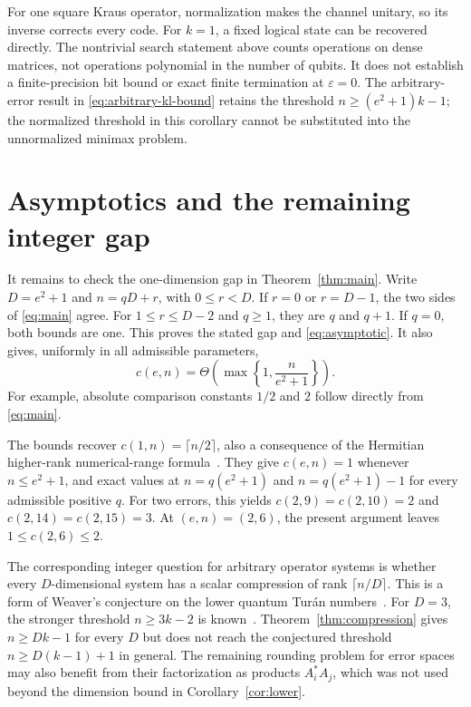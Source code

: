 \documentclass[11pt]{article}
\theoremstyle{remark}
\numberwithin{equation}{section}
\begin{document}
For one square Kraus operator, normalization makes the channel unitary,
so its inverse corrects every code. For $k=1$, a fixed logical state
can be recovered directly. The nontrivial search statement above counts
operations on dense matrices, not operations polynomial in the number
of qubits. It does not establish a finite-precision bit bound or exact
finite termination at $\varepsilon=0$. The arbitrary-error result in
\eqref{eq:arbitrary-kl-bound} retains the threshold
$n\ge(e^2+1)k-1$; the normalized threshold in this corollary cannot be
substituted into the unnormalized minimax problem.

\section{Asymptotics and the remaining integer gap}\label{sec:integer-gap}

It remains to check the one-dimension gap in Theorem~\ref{thm:main}.
Write $D=e^2+1$ and $n=qD+r$, with $0\le r<D$.
If $r=0$ or $r=D-1$, the two sides of \eqref{eq:main} agree.
For $1\le r\le D-2$ and $q\ge1$, they are $q$ and $q+1$.
If $q=0$, both bounds are one. This proves the stated gap and
\eqref{eq:asymptotic}.
It also gives, uniformly in all admissible parameters,
\begin{equation}\label{eq:uniform-scale}
 c(e,n)=\Theta\!\left(\max\!\left\{1,\frac{n}{e^2+1}\right\}\right).
\end{equation}
For example, absolute comparison constants $1/2$ and $2$ follow
directly from \eqref{eq:main}.

The bounds recover $c(1,n)=\lceil n/2\rceil$, also a consequence of
the Hermitian higher-rank numerical-range formula~\cite{CKZ}.
They give $c(e,n)=1$ whenever $n\le e^2+1$, and exact values at
$n=q(e^2+1)$ and $n=q(e^2+1)-1$ for every admissible positive $q$.
For two errors, this yields $c(2,9)=c(2,10)=2$ and
$c(2,14)=c(2,15)=3$. At $(e,n)=(2,6)$, the present argument leaves
$1\le c(2,6)\le2$.

The corresponding integer question for arbitrary operator systems is
whether every $D$-dimensional system has a scalar compression of rank
$\lceil n/D\rceil$. This is a form of Weaver's conjecture on the lower
quantum Tur\'an numbers~\cite[following Theorem~2.11]{Weaver}.
For $D=3$, the stronger threshold $n\ge3k-2$ is known~\cite[Lemma~2.3]{AK}.
Theorem~\ref{thm:compression} gives $n\ge Dk-1$ for every $D$ but does
not reach the conjectured threshold $n\ge D(k-1)+1$ in general.
The remaining rounding problem for error spaces may also benefit from
their factorization as products $A_i^*A_j$, which was not used beyond
the dimension bound in Corollary~\ref{cor:lower}.
\end{document}
